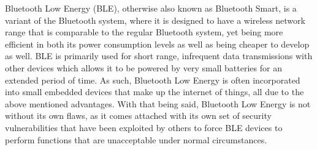 Bluetooth Low Energy (BLE), otherwise also known as Bluetooth Smart, is a variant of the Bluetooth system, where it is designed to have a wireless network range that is comparable to the regular Bluetooth system, yet being more efficient in both its power consumption levels as well as being cheaper to develop as well. BLE is primarily used for short range, infrequent data transmissions with other devices which allows it to be powered by very small batteries for an extended period of time. As such, Bluetooth Low Energy is often incorporated into small embedded devices that make up the internet of things, all due to the above mentioned advantages. With that being said, Bluetooth Low Energy is not without its own flaws, as it comes attached with its own set of security vulnerabilities that have been exploited by others to force BLE devices to perform functions that are unacceptable under normal circumstances.